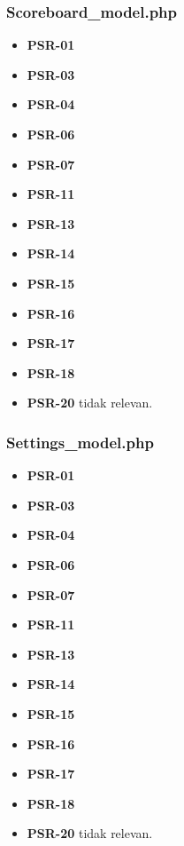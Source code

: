 \subsubsection{Scoreboard\_model.php}
\begin{itemize}
	\item \textbf{PSR-01} 
	\item \textbf{PSR-03}
	\item \textbf{PSR-04}
	\item \textbf{PSR-06}
	\item \textbf{PSR-07}
	\item \textbf{PSR-11}
	\item \textbf{PSR-13}
	\item \textbf{PSR-14}
	\item \textbf{PSR-15}
	\item \textbf{PSR-16}
	\item \textbf{PSR-17} 
	\item \textbf{PSR-18} 
	\item \textbf{PSR-20} tidak relevan.
\end{itemize}

\subsubsection{Settings\_model.php}
\begin{itemize}
	\item \textbf{PSR-01} 
	\item \textbf{PSR-03}
	\item \textbf{PSR-04}
	\item \textbf{PSR-06}
	\item \textbf{PSR-07}
	\item \textbf{PSR-11}
	\item \textbf{PSR-13}
	\item \textbf{PSR-14}
	\item \textbf{PSR-15}
	\item \textbf{PSR-16}
	\item \textbf{PSR-17} 
	\item \textbf{PSR-18} 
	\item \textbf{PSR-20} tidak relevan.
\end{itemize}

